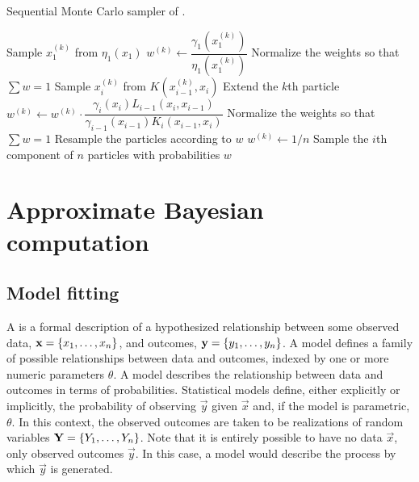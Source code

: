 \begin{algorithm}
  \caption{Sequential Monte Carlo sampler of \textcite{del2006sequential}.}
  \begin{algorithmic}
      \State Sample $x_1^{(k)}$ from $\eta_1(x_1)$
      \State $w^{(k)} \gets \dfrac{\gamma_1\left(x_1^{(k)}\right)}{\eta_1\left(x_1^{(k)}\right)}$
      \State Normalize the weights so that $\sum w = 1$
    \EndFor
        \State Sample $x_i^{(k)}$ from $K(x_{i-1}^{(k)}, x_i)$
        \Comment Extend the $k$th particle
        \State $w^{(k)} \gets w^{(k)} \cdot \dfrac{\gamma_i(x_i) L_{i-1}(x_i, x_{i-1})}{\gamma_{i-1}(x_{i-1}) K_i(x_{i-1}, x_i)}$
      \EndFor
      \State Normalize the weights so that $\sum w = 1$
        \State Resample the particles according to $w$
          \State $w^{(k)} \gets 1/n$
        \EndFor
      \EndIf
      \State Sample the $i$th component of $n$ particles with probabilities $w$
    \EndFor
  \end{algorithmic}
  \label{alg:smcsamp}
\end{algorithm}

\section{Approximate Bayesian computation}
\label{sec:abc}


\subsection{Model fitting}
\label{subsec:mfit}

A  is a formal description of a hypothesized
relationship between some observed data, $\mathbf{x} = \left\lbrace x_1, \ldots, x_n\right\rbrace$,
and outcomes, $\mathbf{y} = \left\lbrace y_1, \ldots, y_n\right\rbrace$. A  model
defines a family of possible relationships between data and outcomes, indexed
by one or more numeric parameters $\theta$. A  model
describes the relationship between data and outcomes in terms of probabilities.
Statistical models define, either explicitly or implicitly, the probability of
observing $\vec{y}$ given $\vec{x}$ and, if the model is parametric, $\theta$.
In this context, the observed outcomes are taken to be realizations of random
variables $\mathbf{Y} = \left\lbrace Y_1, \ldots, Y_n\right\rbrace$. Note that it is entirely possible
to have no data $\vec{x}$, only observed outcomes $\vec{y}$. In this case, a
model would describe the process by which $\vec{y}$ is generated.

